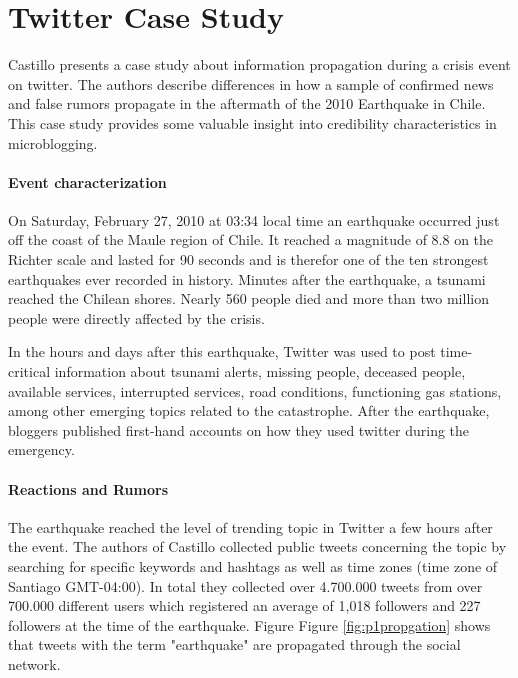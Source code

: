 \documentclass{proseminar}
\let\i\undefined
\newcommand{\i}[1]{\emph{#1}}
\begin{document}


\section{Twitter Case Study}
Castillo \i{et al.} presents a case study about information propagation during a crisis event on twitter. The authors describe differences in how a sample of confirmed news and false rumors propagate in the aftermath of the 2010 Earthquake in Chile. This case study provides some valuable insight into credibility characteristics in microblogging.


\paragraph{Event characterization}
On Saturday, February 27, 2010 at 03:34 local time an earthquake occurred just off the coast of the Maule region of Chile. It reached a magnitude of 8.8 on the Richter scale and lasted for 90 seconds and is therefor one of the ten strongest earthquakes ever recorded in history. Minutes after the earthquake, a
tsunami reached the Chilean shores. Nearly 560 people died and more than two million people were directly affected by the crisis.

In the hours and days after this earthquake, Twitter was used to post time-critical information about tsunami alerts, missing people, deceased people, available services, interrupted services, road conditions, functioning gas stations, among other emerging topics related to the catastrophe. After the earthquake, bloggers published first-hand accounts on how they used twitter during the emergency\cite{p1previouswork}.


\paragraph{Reactions and Rumors}
The earthquake reached the level of trending topic in Twitter a few hours after the event. The authors of Castillo \i{et al.} collected public tweets concerning the topic by searching for specific keywords and hashtags as well as time zones (time zone of Santiago GMT-04:00). In total they collected over 4.700.000 tweets from over 700.000 different users  which registered an average of 1,018 followers and 227 followers at the time of the earthquake. 
Figure Figure \ref{fig:p1propgation} shows that tweets with the term "earthquake" are propagated through the social network.
\end{document}
